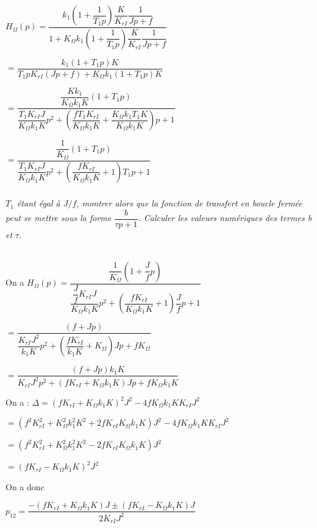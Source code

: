 \documentclass[10pt,fleqn]{article} %
\begin{document}
\begin{multicols}{2}
\ifprof
\begin{corrige}
$H_{\Omega}(p)=\dfrac{k_{1}\left( 1 + \dfrac{1}{T_{1}p} \right)\dfrac{K}{K_{rI}}\dfrac{1}{Jp+f}}{1+ K_{\Omega}k_{1}\left( 1 +\dfrac{1}{T_{1}p} \right)\dfrac{K}{K_{rI}}\dfrac{1}{Jp+f}}$

$=\dfrac{k_{1}\left( 1 + T_{1}p \right)K}{T_{1}p K_{rI}\left(Jp+f\right) + K_{\Omega}k_{1}\left(1+ T_{1}p\right) K}$

$=\dfrac{\dfrac{Kk_{1}}{K_{\Omega}k_{1}K}\left( 1 + T_{1}p \right)}{\dfrac{T_{1} K_{rI}J}{K_{\Omega}k_{1}K}p^2+\left(\dfrac{fT_{1} K_{rI}}{K_{\Omega}k_{1}K}+\dfrac{K_{\Omega}k_{1}T_{1}K}{K_{\Omega}k_{1}K}\right)p + 1 }$


$=\dfrac{\dfrac{1}{K_{\Omega}}\left( 1 + T_{1}p \right)}{\dfrac{T_{1} K_{rI}J}{K_{\Omega}k_{1}K}p^2+\left(\dfrac{f K_{rI}}{K_{\Omega}k_{1}K}+1\right)T_{1}p + 1 }$

\end{corrige}
\else
\fi

\subparagraph{}\textit{$T_1$ étant égal à $J/f$, montrer alors que
  la fonction de transfert en boucle fermée peut se mettre sous la forme
  \(\dfrac{b}{\tau p + 1}\). Calculer les valeurs numériques des termes
  \emph{b} et \emph{$\tau$}.}

\ifprof
\begin{corrige}~\\

On a 
$H_{\Omega}(p)=\dfrac{\dfrac{1}{K_{\Omega}}\left( 1 + \dfrac{J}{f}p \right)}{\dfrac{\dfrac{J}{f} K_{rI}J}{K_{\Omega}k_{1}K}p^2+\left(\dfrac{f K_{rI}}{K_{\Omega}k_{1}K}+1\right)\dfrac{J}{f}p + 1 }$

$=\dfrac{\left( f + Jp \right)}{\dfrac{ K_{rI}J^2}{k_{1}K}p^2+\left(\dfrac{f K_{rI}}{k_{1}K}+K_{\Omega}\right)Jp + fK_{\Omega}}$

$=\dfrac{\left( f + Jp \right)k_{1}K}{ K_{rI}J^2p^2+\left(f K_{rI}+K_{\Omega}k_{1}K\right)Jp + fK_{\Omega}k_{1}K}$


On a :
$\Delta =\left(f K_{rI}+K_{\Omega}k_{1}K\right)^2J^2 -4 fK_{\Omega}k_{1}KK_{rI}J^2 $ 

$=\left(f^2 K_{rI}^2+K_{\Omega}^2k_{1}^2K^2+2f K_{rI}K_{\Omega}k_{1}K\right)J^2 -4 fK_{\Omega}k_{1}KK_{rI}J^2 $

$=\left(f^2 K_{rI}^2+K_{\Omega}^2k_{1}^2K^2-2f K_{rI}K_{\Omega}k_{1}K\right)J^2  $

$=\left(f K_{rI}-K_{\Omega}k_{1}K\right)^2J^2  $

On a donc 

$p_{12} = \dfrac{-\left(f K_{rI}+K_{\Omega}k_{1}K\right)J \pm \left(f K_{rI}-K_{\Omega}k_{1}K\right)J}{2 K_{rI}J^2}$


\end{corrige}
\end{multicols}
\end{document}
